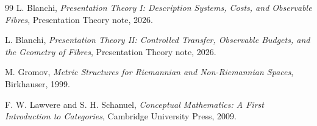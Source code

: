 \documentclass[11pt]{article}
\begin{document}
\begin{thebibliography}{99}
L. Blanchi, \emph{Presentation Theory I: Description Systems, Costs, and Observable Fibres}, Presentation Theory note, 2026.

L. Blanchi, \emph{Presentation Theory II: Controlled Transfer, Observable Budgets, and the Geometry of Fibres}, Presentation Theory note, 2026.

M. Gromov, \emph{Metric Structures for Riemannian and Non-Riemannian Spaces}, Birkhauser, 1999.

F. W. Lawvere and S. H. Schanuel, \emph{Conceptual Mathematics: A First Introduction to Categories}, Cambridge University Press, 2009.
\end{thebibliography}
\end{document}
